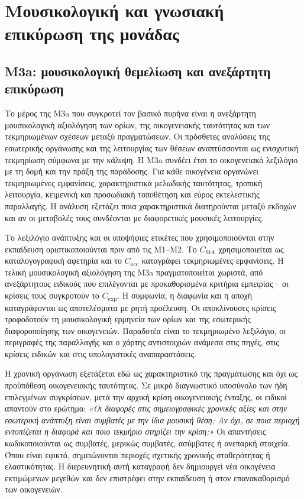 \documentclass[11pt,a4paper]{article}
\begin{document}
\section{Μουσικολογική και γνωσιακή επικύρωση της μονάδας}\label{sec:m3-human}

\subsection{M3a: μουσικολογική θεμελίωση και ανεξάρτητη επικύρωση}\label{sec:m3a}

Το μέρος της M3a που συγκροτεί τον βασικό πυρήνα είναι η ανεξάρτητη μουσικολογική αξιολόγηση των ορίων, της οικογενειακής ταυτότητας και των τεκμηριωμένων σχέσεων μεταξύ πραγματώσεων. Οι πρόσθετες αναλύσεις της εσωτερικής οργάνωσης και της λειτουργίας των θέσεων αναπτύσσονται ως ενισχυτική τεκμηρίωση σύμφωνα με την κάλυψη. Η M3a συνδέει έτσι το οικογενειακό λεξιλόγιο με τη δομή και την πράξη της παράδοσης. Για κάθε οικογένεια οργανώνει τεκμηριωμένες εμφανίσεις, χαρακτηριστικά μελωδικής ταυτότητας, τροπική λειτουργία, κειμενική και προσωδιακή τοποθέτηση και εύρος εκτελεστικής παραλλαγής. Η ανάλυση εξετάζει ποια χαρακτηριστικά διατηρούνται μεταξύ εκδοχών και αν οι μεταβολές τους συνδέονται με διαφορετικές μουσικές λειτουργίες.

Το λεξιλόγιο ανάπτυξης και οι υποψήφιες ετικέτες που χρησιμοποιούνται στην εκπαίδευση οριστικοποιούνται πριν από τις M1--M2. Το $C_{\mathrm{StA}}$ χρησιμοποιείται ως καταλογογραφική αφετηρία και το $C_{\mathrm{occ}}$ καταγράφει τεκμηριωμένες εμφανίσεις. Η τελική μουσικολογική αξιολόγηση της M3a πραγματοποιείται χωριστά, από ανεξάρτητους ειδικούς που επιλέγονται με προκαθορισμένα κριτήρια εμπειρίας· οι κρίσεις τους συγκροτούν το $C_{\mathrm{exp}}$. Η συμφωνία, η διαφωνία και η αποχή καταγράφονται ως αποτελέσματα με ρητή προέλευση. Οι αποκλίνουσες κρίσεις τροφοδοτούν τη μουσικολογική ερμηνεία των ορίων και της εσωτερικής διαφοροποίησης των οικογενειών. Παραδοτέα είναι το τεκμηριωμένο λεξιλόγιο, οι περιγραφές της παραλλαγής και ο χάρτης αντιστοιχιών ανάμεσα στις πηγές, στις κρίσεις ειδικών και στις υπολογιστικές αναπαραστάσεις.

Η χρονική οργάνωση εξετάζεται εδώ ως χαρακτηριστικό της πραγμάτωσης και όχι ως προϋπόθεση οικογενειακής ταυτότητας. Σε μικρό διαγνωστικό υποσύνολο των ήδη επιλεγμένων συγκρίσεων, μετά την αρχική κρίση οικογενειακής ένταξης, οι ειδικοί απαντούν στο ερώτημα: \emph{«Οι διαφορές στις σημειογραφικές χρονικές αξίες και στην εσωτερική ανάπτυξη είναι συμβατές με την ίδια μουσική θέση; Αν όχι, σε ποια περιοχή εντοπίζεται η διαφορά και ποιο τεκμήριο στηρίζει την κρίση;»} Οι απαντήσεις κωδικοποιούνται ως συμβατές, μερικώς συμβατές, ασύμβατες ή ανεπαρκή στοιχεία. Όπου είναι εφικτό, σημειώνονται περιοχές σχετικής χρονικής σταθερότητας ή ελαστικότητας. Η διερευνητική αυτή καταγραφή δεν δημιουργεί νέα οικογένεια εκτιμώμενων μεγεθών και δεν επιστρέφει στην εκπαίδευση ή στον επανακαθορισμό των οικογενειών.
\end{document}

